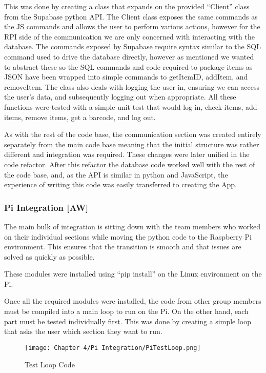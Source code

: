 This was done by creating a class that expands on the provided “Client” class from the Supabase python API.
The Client class exposes the same commands as the JS commands and allows the user to perform various actions, however for the RPI side of the communication we are only concerned with interacting with the database.
The commands exposed by Supabase require syntax similar to the SQL command used to drive the database directly, however as mentioned we wanted to abstract these so the SQL commands and code required to package items as JSON have been wrapped into simple commands to getItemID, addItem, and removeItem.
The class also deals with logging the user in, ensuring we can access the user's data, and subsequently logging out when appropriate.
All these functions were tested with a simple unit test that would log in, check items, add items, remove items, get a barcode, and log out.

As with the rest of the code base, the communication section was created entirely separately from the main code base meaning that the initial structure was rather different and integration was required.
These changes were later unified in the code refactor.
After this refactor the database code worked well with the rest of the code base, and, as the API is similar in python and JavaScript, the experience of writing this code was easily transferred to creating the App.

\subsubsection {Pi Integration [AW]}

The main bulk of integration is sitting down with the team members who worked on their individual sections while moving the python code to the Raspberry Pi environment.
This ensures that the transition is smooth and that issues are solved as quickly as possible.



These modules were installed using “pip install” on the Linux environment on the Pi.

Once all the required modules were installed, the code from other group members must be compiled into a main loop to run on the Pi.
On the other hand, each part must be tested individually first.
This was done by creating a simple loop that asks the user which section they want to run.

\begin{figure}[H]        
    \centering
    \texttt{[image: Chapter 4/Pi Integration/PiTestLoop.png]}
    \caption{Test Loop Code}
    \label{fig:tlcode}
\end{figure} 


